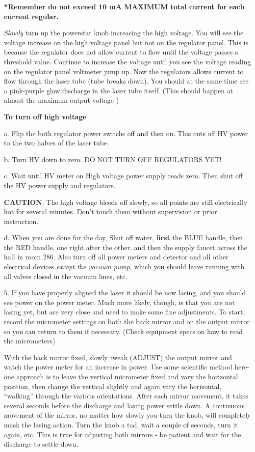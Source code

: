 \documentclass{../lab}
\begin{document}
\textbf{*Remember do not exceed 10 mA MAXIMUM total current for each current regular.}

\emph{Slowly} turn up the powerstat knob increasing the high voltage. You will see the voltage increase on the high voltage panel but not on the regulator panel. This is because the regulator does not allow current to flow until the voltage passes a threshold value. Continue to increase the voltage until you see the voltage reading on the regulator panel voltmeter jump up. Now the regulators allows current to flow through the laser tube (tube breaks down). You should at the same time see a pink-purple glow discharge in the laser tube itself. (This should happen at almost the maximum output voltage )

\textbf{To turn off high voltage}

a. Flip the both regulator power switchs off and then on. This cuts off HV power to the two halves of the laser tube.

b. Turn HV down to zero. DO NOT TURN OFF REGULATORS YET!

c. Wait until HV meter on High voltage power supply reads zero. Then shut off the HV power supply and regulators.

\textbf{CAUTION}: The high voltage bleeds off slowly, so all points are still electrically hot for several minutes. Don't touch them without supervision or prior instruction.

d. When you are done for the day, Shut off water, \textbf{first} the BLUE handle, then the RED handle, one right after the other, and then the supply faucet across the hall in room 286. Also turn off all power meters and detector and all other electrical devices \emph{except the vacuum pump}, which you should leave running with all valves closed in the vacuum lines, etc.

5. If you have properly aligned the laser it should be now lasing, and you should see power on the power meter. Much more likely, though, is that you are not lasing yet, but are very close and need to make some fine adjustments. To start, record the micrometer settings on both the back mirror and on the output mirror so you can return to them if necessary. (Check equipment specs on how to read the micrometers)

With the back mirror fixed, slowly tweak (ADJUST) the output mirror and watch the power meter for an increase in power. Use some scientific method here-one approach is to leave the vertical micrometer fixed and vary the horizontal position, then change the vertical slightly and again vary the horizontal, ``walking'' through the various orientations. After each mirror movement, it takes several seconds before the discharge and lasing power settle down. A continuous movement of the mirror, no matter how slowly you turn the knob, will completely mask the lasing action. Turn the knob a tad, wait a couple of seconds, turn it again, etc. This is true for adjusting both mirrors - be patient and wait for the discharge to settle down.
\end{document}
